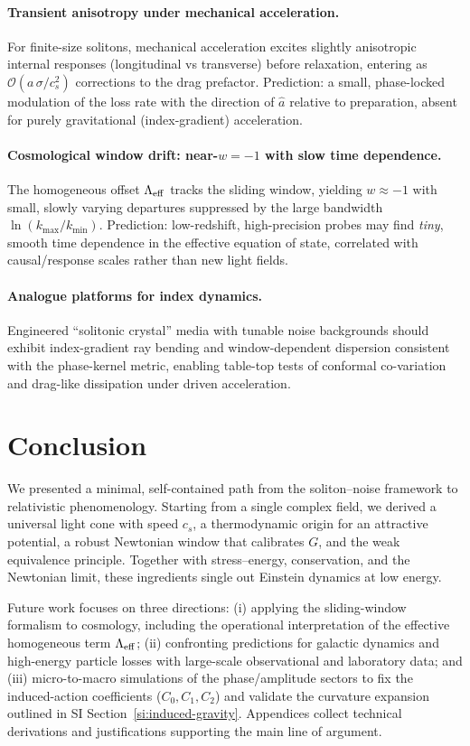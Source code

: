 \documentclass[11pt]{article}
\begin{document}
\paragraph{Transient anisotropy under mechanical acceleration.} For finite-size solitons, mechanical acceleration excites slightly anisotropic internal responses (longitudinal vs transverse) before relaxation, entering as $\mathcal O(a\,\sigma/c_s^2)$ corrections to the drag prefactor. Prediction: a small, phase-locked modulation of the loss rate with the direction of $\hat a$ relative to preparation, absent for purely gravitational (index-gradient) acceleration.

\paragraph{Cosmological window drift: near-$w=-1$ with slow time dependence.} The homogeneous offset $\Lambda_{\rm eff}$ tracks the sliding window, yielding $w\approx -1$ with small, slowly varying departures suppressed by the large bandwidth $\ln(k_{\max}/k_{\min})$. Prediction: low-redshift, high-precision probes may find \emph{tiny}, smooth time dependence in the effective equation of state, correlated with causal/response scales rather than new light fields.

\paragraph{Analogue platforms for index dynamics.} Engineered “solitonic crystal” media with tunable noise backgrounds should exhibit index-gradient ray bending and window-dependent dispersion consistent with the phase-kernel metric, enabling table-top tests of conformal co-variation and drag-like dissipation under driven acceleration.

\section{Conclusion}
We presented a minimal, self-contained path from the soliton--noise framework to relativistic phenomenology. Starting from a single complex field, we derived a universal light cone with speed $c_s$, a thermodynamic origin for an attractive potential, a robust Newtonian window that calibrates $G$, and the weak equivalence principle. Together with stress--energy, conservation, and the Newtonian limit, these ingredients single out Einstein dynamics at low energy.

Future work focuses on three directions: (i) applying the sliding-window formalism to cosmology, including the operational interpretation of the effective homogeneous term $\Lambda_{\rm eff}$; (ii) confronting predictions for galactic dynamics and high-energy particle losses with large-scale observational and laboratory data; and (iii) micro-to-macro simulations of the phase/amplitude sectors to fix the induced-action coefficients ($C_0, C_1, C_2$) and validate the curvature expansion outlined in SI Section~\ref{si:induced-gravity}. Appendices collect technical derivations and justifications supporting the main line of argument.
\end{document}
